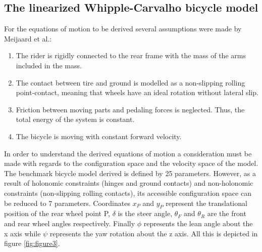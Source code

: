 \subsection{The linearized Whipple-Carvalho bicycle model}




    For  the equations of motion to be derived several assumptions were made by Meijaard  et al.\cite{meijaard2007linearized}:

    \begin{enumerate}
        \item The rider is rigidly connected to the rear frame with the mass of the arms included in the mass.
        \item The contact between tire and ground is modelled as a non-slipping rolling point-contact, meaning
              that wheels have an ideal rotation without lateral slip.
        \item Friction between moving parts and pedaling forces is neglected. Thus, the total energy of the
              system is constant.
        \item The bicycle is moving with constant forward velocity.
    \end{enumerate}
\par
In order to understand the derived equations of motion a consideration must be made with regards to the configuration space and the velocity space of the model. The benchmark bicycle model derived is defined by 25 parameters. However, as a result of holonomic constraints (hinges and ground contacts) and non-holonomic constraints (non-slipping rolling contacts), its accessible configuration space can be reduced to 7 parameters. Coordinates \ensuremath{x_{P}} and \ensuremath{y_{P}} represent the translational position of the rear wheel point P, \ensuremath{\delta} is the steer angle, \ensuremath{\theta_{F}} and \ensuremath{\theta_{R}}  are the front and rear wheel angles respectively. Finally \ensuremath{\phi}  represents the lean angle about the x axis while \ensuremath{\psi}  represents the yaw rotation about the z axis. All this is depicted in figure \ref{fig:figure3}.
